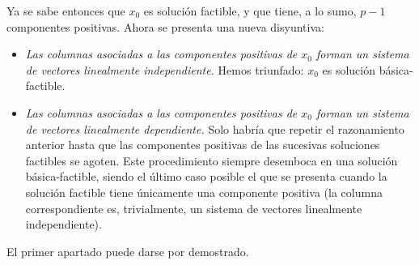 \documentclass[11pt]{report}
\makeatletter
\renewenvironment{proof}[1][\proofname]{\par
  \pushQED{\qed}%
  \normalfont \topsep\z@skip %
  \trivlist
  \item[\hskip\labelsep
        \itshape
    #1\@addpunct{.}]\ignorespaces
}{%
  \popQED\endtrivlist\@endpefalse
}
\theoremstyle{mytheorem}
\theoremstyle{mydefinition}
\theoremstyle{myexample}
\let\oldproofname=\proofname
\renewcommand{\proofname}{\rm\bf{\oldproofname}}}
\makeatother
\begin{document}
\begin{proof}
\begin{itemize}
    Ya se sabe entonces que $x_0$ es solución factible, y que tiene, a lo sumo, $p-1$ componentes positivas. Ahora se presenta una nueva disyuntiva:
    \begin{itemize}
        \item \textit{Las columnas asociadas a las componentes positivas de $x_0$ forman un sistema de vectores linealmente independiente.} Hemos triunfado: $x_0$ es solución básica-factible.
        \item \textit{Las columnas asociadas a las componentes positivas de $x_0$ forman un sistema de vectores linealmente dependiente.} Solo habría que repetir el razonamiento anterior hasta que las componentes positivas de las sucesivas soluciones factibles se agoten. Este procedimiento siempre desemboca en una solución básica-factible, siendo el último caso posible el que se presenta cuando la solución factible tiene únicamente una componente positiva (la columna correspondiente es, trivialmente, un sistema de vectores linealmente independiente).
    \end{itemize}
\end{itemize}

El primer apartado puede darse por demostrado. 


\end{proof}
\end{document}

